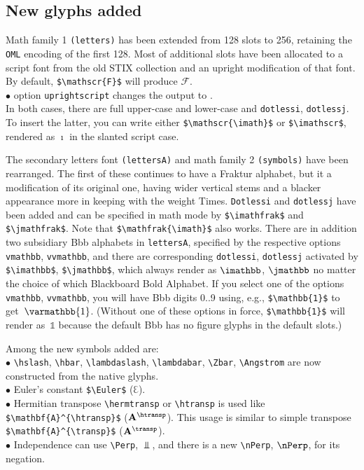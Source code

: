 \documentclass[11pt]{article}
\theoremstyle{oldplain}
\theoremstyle{plain}
\begin{document}
\subsection{New glyphs added}  Math family 1 {\tt (letters)} has been extended from 128 slots to 256, retaining the {\tt OML} encoding of the first 128. Most of additional slots have been allocated to a script font from the old STIX collection and an upright modification of that font.
By default, \verb|$\mathscr{F}$| will produce $\mathscr{F}$.\\
$\bullet$ option {\tt uprightscript} changes the output to {}.\\
In both cases, there are full upper-case and lower-case and {\tt dotlessi}, {\tt dotlessj}. To insert the latter, you can write either \verb|$\mathscr{\imath}$| or \verb|$\imathscr$|, rendered as $\mathscr{\imath}$ in the slanted script case.

The secondary letters font {\tt (lettersA)} and math family 2 {\tt(symbols)} have been rearranged. The first of these continues to have a Fraktur alphabet, but it a modification of its original one, having wider vertical stems and a blacker appearance more in keeping with the weight Times. {\tt Dotlessi} and {\tt dotlessj} have been added and can be specified in math mode by \verb|$\imathfrak$| and \verb|$\jmathfrak$|. Note that \verb|$\mathfrak{\imath}$| also works. There are in addition two subsidiary Bbb alphabets in {\tt lettersA}, specified by the respective options {\tt vmathbb}, {\tt vvmathbb}, and there are corresponding {\tt dotlessi}, {\tt dotlessj} activated by \verb|$\imathbb$|, \verb|$\jmathbb$|, which always render as $\imathbb$, $\jmathbb$ no matter the choice of which Blackboard Bold Alphabet. If you select one of the options {\tt vmathbb}, {\tt vvmathbb}, you will have Bbb digits 0..9 using, e.g., \verb|$\mathbb{1}$| to get~$\varmathbb{1}$. (Without one of these options in force, \verb|$\mathbb{1}$| will render as~$\mathbb{1}$ because the default Bbb has no figure glyphs in the default slots.)

Among the new symbols added are:\\
$\bullet$ \verb|\hslash|, \verb|\hbar|, \verb|\lambdaslash|, \verb|\lambdabar|, \verb|\Zbar|, \verb|\Angstrom| are now constructed from the native glyphs.\\
$\bullet$ Euler's constant \verb|$\Euler$| ($\Euler$).\\
$\bullet$ Hermitian transpose \verb|\hermtransp| or \verb|\htransp| is used like \verb|$\mathbf{A}^{\htransp}$| ($\mathbf{A}^{\htransp}$). This usage is similar to simple transpose \verb|$\mathbf{A}^{\transp}$| ($\mathbf{A}^{\transp}$).\\
$\bullet$ Independence can use \verb|\Perp|, $\Perp$, and there is a new \verb|\nPerp|, $\nPerp$, for its negation.
\end{document}
